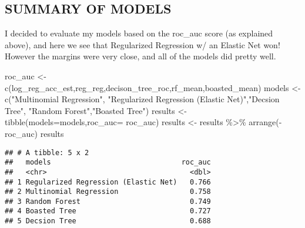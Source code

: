 \documentclass[
]{article}
\newenvironment{Shaded}{\begin{snugshade}}{\end{snugshade}}
\newcommand{\AttributeTok}[1]{\textcolor[rgb]{0.77,0.63,0.00}{#1}}
\newcommand{\FunctionTok}[1]{\textcolor[rgb]{0.00,0.00,0.00}{#1}}
\newcommand{\NormalTok}[1]{#1}
\newcommand{\OtherTok}[1]{\textcolor[rgb]{0.56,0.35,0.01}{#1}}
\newcommand{\SpecialCharTok}[1]{\textcolor[rgb]{0.00,0.00,0.00}{#1}}
\newcommand{\StringTok}[1]{\textcolor[rgb]{0.31,0.60,0.02}{#1}}
\begin{document}
\hypertarget{summary-of-models}{%
\subsection{SUMMARY OF MODELS}\label{summary-of-models}}

I decided to evaluate my models based on the roc\_auc score (as
explained above), and here we see that Regularized Regression w/ an
Elastic Net won! However the margins were very close, and all of the
models did pretty well.

\begin{Shaded}
\begin{Highlighting}[]
\NormalTok{roc\_auc }\OtherTok{\textless{}{-}} \FunctionTok{c}\NormalTok{(log\_reg\_acc\_est,reg\_reg,decison\_tree\_roc,rf\_mean,boasted\_mean)}
\NormalTok{models }\OtherTok{\textless{}{-}} \FunctionTok{c}\NormalTok{(}\StringTok{"Multinomial Regression"}\NormalTok{, }\StringTok{"Regularized Regression (Elastic Net)"}\NormalTok{,}\StringTok{"Decsion Tree"}\NormalTok{, }\StringTok{"Random Forest"}\NormalTok{,}\StringTok{"Boasted Tree"}\NormalTok{)}
\NormalTok{results }\OtherTok{\textless{}{-}} \FunctionTok{tibble}\NormalTok{(}\AttributeTok{models=}\NormalTok{models,}\AttributeTok{roc\_auc=}\NormalTok{ roc\_auc)}
\NormalTok{results }\OtherTok{\textless{}{-}}\NormalTok{ results }\SpecialCharTok{\%\textgreater{}\%}
  \FunctionTok{arrange}\NormalTok{(}\SpecialCharTok{{-}}\NormalTok{roc\_auc)}
\NormalTok{results}
\end{Highlighting}
\end{Shaded}

\begin{verbatim}
## # A tibble: 5 x 2
##   models                               roc_auc
##   <chr>                                  <dbl>
## 1 Regularized Regression (Elastic Net)   0.766
## 2 Multinomial Regression                 0.758
## 3 Random Forest                          0.749
## 4 Boasted Tree                           0.727
## 5 Decsion Tree                           0.688
\end{verbatim}
\end{document}
